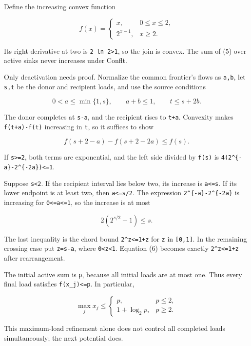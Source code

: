 Define the increasing convex function

\[
f(x)=\begin{cases}x,&0\le x\le2,\\2^{x-1},&x\ge2.
\end{cases}                                     \tag{5}
\]

Its right derivative at two is \texttt{2\ ln\ 2\textgreater{}1}, so the join is convex. The sum of (5) over active sinks never increases under Conflt.

Only deactivation needs proof. Normalize the common frontier's flows as \texttt{a,b}, let \texttt{s,t} be the donor and recipient loads, and use the source conditions

\[
0<a\le\min\{1,s\},\qquad a+b\le1,\qquad t\le s+2b.
\]

The donor completes at \texttt{s-a}, and the recipient rises to \texttt{t+a}. Convexity makes \texttt{f(t+a)-f(t)} increasing in \texttt{t}, so it suffices to show

\[
f(s+2-a)-f(s+2-2a)\le f(s).                      \tag{6}
\]

If \texttt{s\textgreater{}=2}, both terms are exponential, and the left side divided by \texttt{f(s)} is \texttt{4(2\^{}\{-a\}-2\^{}\{-2a\})\textless{}=1}.

Suppose \texttt{s\textless{}2}. If the recipient interval lies below two, its increase is \texttt{a\textless{}=s}. If its lower endpoint is at least two, then \texttt{a\textless{}=s/2}. The expression \texttt{2\^{}\{-a\}-2\^{}\{-2a\}} is increasing for \texttt{0\textless{}=a\textless{}=1}, so the increase is at most

\[
2(2^{s/2}-1)\le s.
\]

The last inequality is the chord bound \texttt{2\^{}z\textless{}=1+z} for \texttt{z} in \texttt{{[}0,1{]}}. In the remaining crossing case put \texttt{z=s-a}, where \texttt{0\textless{}z\textless{}1}. Equation (6) becomes exactly \texttt{2\^{}z\textless{}=1+z} after rearrangement.

The initial active sum is \texttt{p}, because all initial loads are at most one. Thus every final load satisfies \texttt{f(x\_j)\textless{}=p}. In particular,

\[
\max_jx_j\le\begin{cases}p,&p\le2,\\1+\log_2p,&p\ge2.\end{cases}\tag{7}
\]

This maximum-load refinement alone does not control all completed loads simultaneously; the next potential does.

